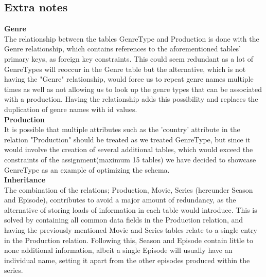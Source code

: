 \subsection{Extra notes}
\large\textbf{Genre}\\\normalsize
The relationship between the tables GenreType and Production is done with the Genre relationship, which contains references to the aforementioned tables' primary keys, as foreign key constraints. This could seem redundant as a lot of GenreTypes will reoccur in the Genre table but the alternative, which is not having the "Genre" relationship, would force us to repeat genre names multiple times as well as not allowing us to look up the genre types that can be associated with a production. Having the relationship adds this possibility and replaces the duplication of genre names with id values.\\
\newline
\large\textbf{Production}\\\normalsize
It is possible that multiple attributes such as the 'country' attribute in the relation "Production" should be treated as we treated GenreType, but since it would involve the creation of several additional tables, which would exceed the constraints of the assignment(maximum 15 tables) we have decided to showcase GenreType as an example of optimizing the schema.\\
\newline
\large\textbf{Inheritance}\\\normalsize
The combination of the relations; Production, Movie, Series (hereunder Season and Episode), contributes to avoid a major amount of redundancy, as the alternative of storing loads of information in each table would introduce. This is solved by containing all common data fields in the Production relation, and having the previously mentioned Movie and Series tables relate to a single entry in the Production relation. Following this, Season and Episode contain little to none additional information, albeit a single Episode will usually have an individual name, setting it apart from the other episodes produced within the series.
